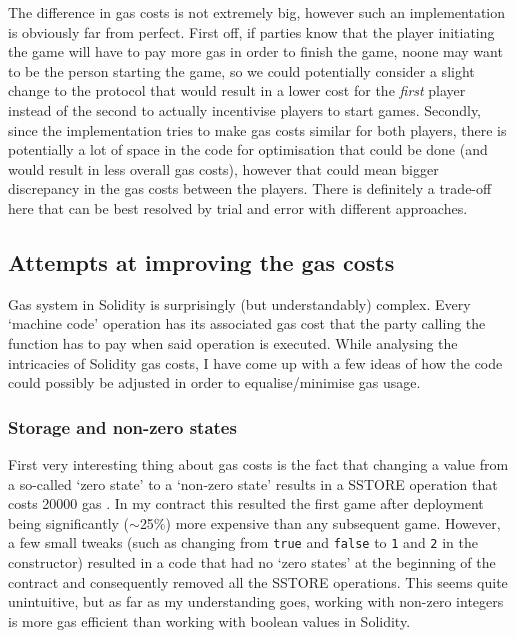 \documentclass{article}
\begin{document}
    \noindent The difference in gas costs is not extremely
    big, however such an implementation is obviously far
    from perfect. First off, if parties know that the player
    initiating the game will have to pay more gas in order
    to finish the game, noone may want to be the person
    starting the game, so we could potentially consider a
    slight change to the protocol that would result in a
    lower cost for the {\itshape first} player instead of
    the second to actually incentivise players to start
    games. Secondly, since the implementation tries to make
    gas costs similar for both players, there is potentially
    a lot of space in the code for optimisation that could
    be done (and would result in less overall gas costs),
    however that could mean bigger discrepancy in the gas
    costs between the players. There is definitely a
    trade-off here that can be best resolved by trial and
    error with different approaches.
    
    \subsection{Attempts at improving the gas costs}
    Gas system in Solidity is surprisingly (but
    understandably) complex. Every `machine code' operation
    has its associated gas cost that the party calling the
    function has to pay when said operation is executed.
    While analysing the intricacies of Solidity gas costs, I
    have come up with a few ideas of how the code could
    possibly be adjusted in order to equalise/minimise gas
    usage.

    \subsubsection{Storage and non-zero states}
    First very interesting thing about gas costs is the fact
    that changing a value from a so-called `zero state' to a
    `non-zero state' results in a SSTORE operation that
    costs 20000 gas \cite{ypaper}. In my contract this
    resulted the first game after deployment being
    significantly (\(\sim\)25\%) more expensive than any
    subsequent game. However, a few small tweaks (such as
    changing from \verb|true| and \verb|false| to \verb|1|
    and \verb|2| in the constructor) resulted in a code that
    had no `zero states' at the beginning of the contract
    and consequently removed all the SSTORE operations. This
    seems quite unintuitive, but as far as my understanding
    goes, working with non-zero integers is more gas
    efficient than working with boolean values in Solidity.
    \newline
\end{document}
